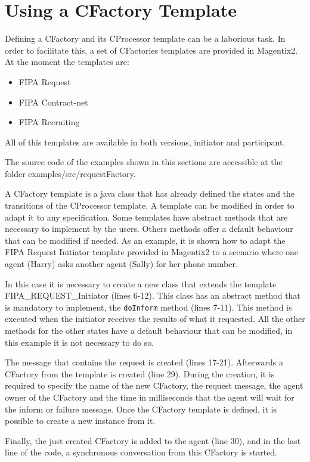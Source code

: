 \section{Using a CFactory Template}
\label{subsec:usingATemplate}
Defining a CFactory and its CProcessor template can be a laborious task. In order to facilitate this, a set of CFactories templates are provided in Magentix2. At the moment the templates are:
\begin{itemize}
 \item FIPA Request
 \item FIPA Contract-net
 \item FIPA Recruiting
\end{itemize}
All of this templates are available in both versions, initiator and participant.

The source code of the examples shown in this sections are accessible at the folder examples/src/requestFactory.

A CFactory template is a java class that has already defined the states and the transitions of the CProcessor template. A template can be modified in order to adapt it to any specification. Some templates have abstract methods that are necessary to implement by the users. Others methods offer a default behaviour that can be modified if needed. As an example, it is shown how to adapt the FIPA Request Initiator template provided in Magentix2 to a scenario where one agent (Harry) asks another agent (Sally) for her phone number.

In this case it is necessary to create a new class that extends the template FIPA\_REQUEST\_Ini\-tia\-tor (lines 6-12). This class has an abstract method that is mandatory to implement, the \texttt{doInform} method (lines 7-11). This method is executed when the initiator receives the results of what it requested. All the other methods for the other states have a default behaviour that can be modified, in this example it is not necessary to do so.

The message that contains the request is created (lines 17-21). Afterwards a CFactory from the template is created (line 29). During the creation, it is required to specify the name of the new CFactory, the request message, the agent owner of the CFactory and the time in milliseconds that the agent will wait for the inform or failure message. Once the CFactory template is defined, it is possible to create a new instance from it.

Finally, the just created CFactory is added to the agent (line 30), and in the last line of the code, a synchronous conversation from this CFactory is started.

